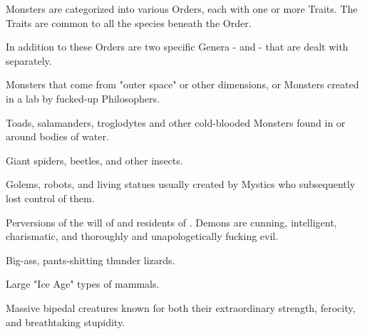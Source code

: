 
Monsters are categorized into various Orders, each with one or more Traits.  The Traits are common to all the species beneath the Order.

In addition to these Orders are two specific Genera -  and  - that are dealt with separately.

\cbreak


Monsters that come from "outer space" or other dimensions, or Monsters created in a lab by fucked-up Philosophers.



Toads, salamanders, troglodytes and other cold-blooded Monsters found in or around bodies of water.  


Giant spiders, beetles, and other insects.


Golems, robots, and living statues usually created by Mystics who subsequently lost control of them.



Perversions of the will of \TheAuthority and residents of . Demons are cunning, intelligent, charismatic, and thoroughly and unapologetically fucking evil.



Big-ass, pants-shitting thunder lizards.  




Large "Ice Age" types of mammals.




Massive bipedal creatures known for both their extraordinary strength, ferocity, and breathtaking stupidity.


